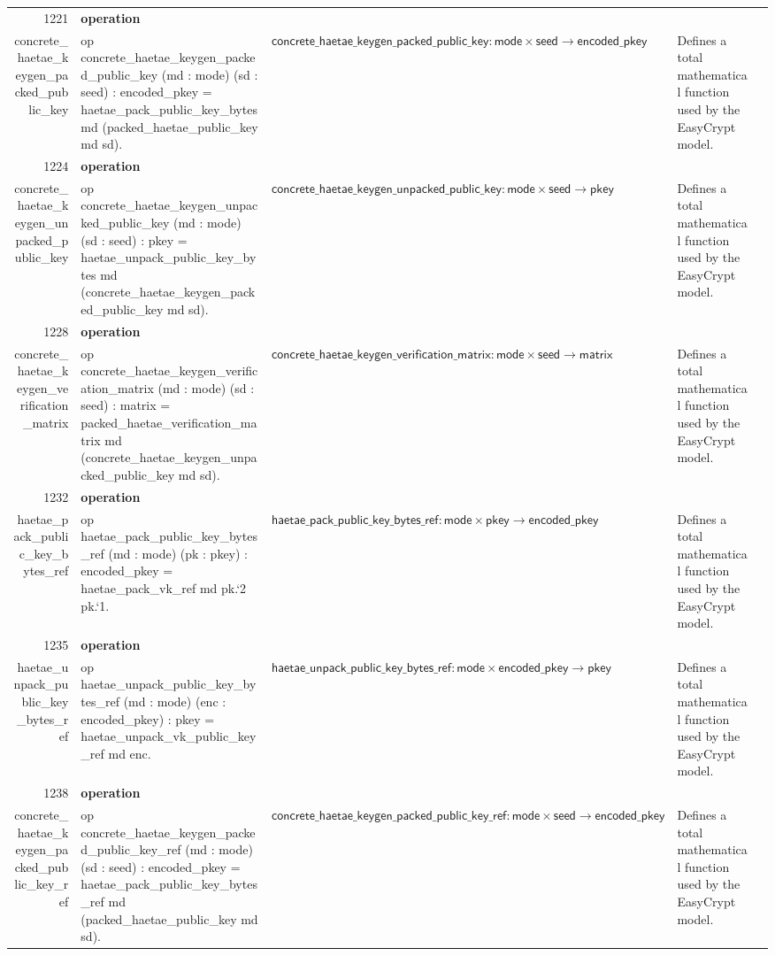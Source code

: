 \documentclass[10pt]{article}
\newcommand{\ec}[1]{\begingroup\ttfamily\scriptsize #1\endgroup}
\begin{document}
\begin{longtable}{r L{0.17\textwidth} L{0.26\textwidth} L{0.27\textwidth} L{0.20\textwidth}}
1221 & \textbf{operation}\\\ec{concrete\_haetae\_keygen\_packed\_public\_key} & \ec{op concrete\_haetae\_keygen\_packed\_public\_key (md : mode) (sd : seed) : encoded\_pkey = haetae\_pack\_public\_key\_bytes md (packed\_haetae\_public\_key md sd).} & \(\mathsf{concrete\_haetae\_keygen\_packed\_public\_key} : \mathsf{mode} \times \mathsf{seed} \to \mathsf{encoded\_pkey}\) & Defines a total mathematical function used by the EasyCrypt model. \\
1224 & \textbf{operation}\\\ec{concrete\_haetae\_keygen\_unpacked\_public\_key} & \ec{op concrete\_haetae\_keygen\_unpacked\_public\_key (md : mode) (sd : seed) : pkey = haetae\_unpack\_public\_key\_bytes md (concrete\_haetae\_keygen\_packed\_public\_key md sd).} & \(\mathsf{concrete\_haetae\_keygen\_unpacked\_public\_key} : \mathsf{mode} \times \mathsf{seed} \to \mathsf{pkey}\) & Defines a total mathematical function used by the EasyCrypt model. \\
1228 & \textbf{operation}\\\ec{concrete\_haetae\_keygen\_verification\_matrix} & \ec{op concrete\_haetae\_keygen\_verification\_matrix (md : mode) (sd : seed) : matrix = packed\_haetae\_verification\_matrix md (concrete\_haetae\_keygen\_unpacked\_public\_key md sd).} & \(\mathsf{concrete\_haetae\_keygen\_verification\_matrix} : \mathsf{mode} \times \mathsf{seed} \to \mathsf{matrix}\) & Defines a total mathematical function used by the EasyCrypt model. \\
1232 & \textbf{operation}\\\ec{haetae\_pack\_public\_key\_bytes\_ref} & \ec{op haetae\_pack\_public\_key\_bytes\_ref (md : mode) (pk : pkey) : encoded\_pkey = haetae\_pack\_vk\_ref md pk.`2 pk.`1.} & \(\mathsf{haetae\_pack\_public\_key\_bytes\_ref} : \mathsf{mode} \times \mathsf{pkey} \to \mathsf{encoded\_pkey}\) & Defines a total mathematical function used by the EasyCrypt model. \\
1235 & \textbf{operation}\\\ec{haetae\_unpack\_public\_key\_bytes\_ref} & \ec{op haetae\_unpack\_public\_key\_bytes\_ref (md : mode) (enc : encoded\_pkey) : pkey = haetae\_unpack\_vk\_public\_key\_ref md enc.} & \(\mathsf{haetae\_unpack\_public\_key\_bytes\_ref} : \mathsf{mode} \times \mathsf{encoded\_pkey} \to \mathsf{pkey}\) & Defines a total mathematical function used by the EasyCrypt model. \\
1238 & \textbf{operation}\\\ec{concrete\_haetae\_keygen\_packed\_public\_key\_ref} & \ec{op concrete\_haetae\_keygen\_packed\_public\_key\_ref (md : mode) (sd : seed) : encoded\_pkey = haetae\_pack\_public\_key\_bytes\_ref md (packed\_haetae\_public\_key md sd).} & \(\mathsf{concrete\_haetae\_keygen\_packed\_public\_key\_ref} : \mathsf{mode} \times \mathsf{seed} \to \mathsf{encoded\_pkey}\) & Defines a total mathematical function used by the EasyCrypt model. \\

\end{longtable}
\end{document}
